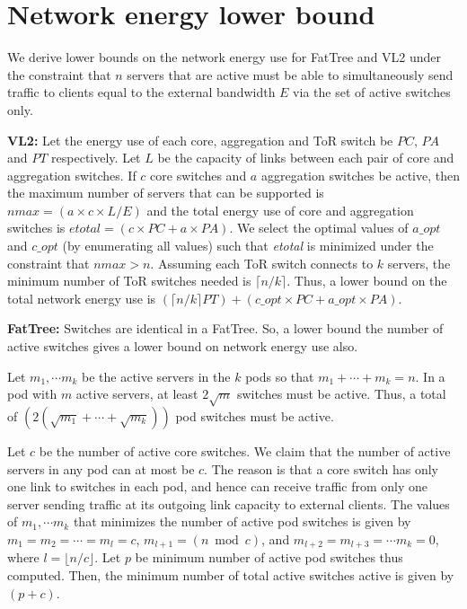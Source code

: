 


\section{Network energy lower bound}
\label{sec:netlb}
We derive lower bounds on the network energy use for FatTree \cite{fattree} and VL2 \cite{vl2} under the constraint that $n$  servers that are active must be able to simultaneously send traffic to clients equal to the external bandwidth $E$ via the set of active switches only.

\textbf{VL2:} Let the energy use of each core, aggregation and ToR switch be $PC$, $PA$ and $PT$ respectively.
Let $L$ be the capacity of links between each pair of core and aggregation switches. 
If  $c$ core switches and $a$ aggregation switches be active, then
the maximum number of servers that can be supported is $ \textit{nmax} = (a\times c\times L/E)$ and the total energy use of core and aggregation switches is $\textit{etotal} = (c \times PC + a \times PA)$. 
We select the optimal values of $\textit{a\_opt}$ and $\textit{c\_opt}$ (by enumerating all values) such that \textit{etotal} is minimized under the constraint that $\textit{nmax} > n$. 
Assuming each ToR switch connects to $k$ servers,  the minimum number of ToR switches needed is $\lceil n/k \rceil$. 
Thus, a lower bound on the total network energy use is $(\lceil n/k \rceil PT) + (\textit{c\_opt} \times PC + \textit{a\_opt} \times PA)$.


\textbf{FatTree:} Switches are identical in a FatTree. So, a lower bound the number of active switches gives a lower bound on network energy use also.




Let $m_1, \cdots m_k$ be the active servers in the $k$ pods so that $m_1 + \cdots + m_k = n$.  In a pod with $m$ active servers, at least $2 \sqrt{m}$ switches must be active. Thus, a total of $(2 (\sqrt{m_1} + \cdots + \sqrt{m_k} ))$ pod switches must be active. 

Let $c$ be the number of active core switches. We claim that the number of active servers in any pod can at most be $c$. The reason is that a core switch has only one link to switches in each pod, and hence can receive traffic from only one server sending traffic at its outgoing link capacity to external clients. The values of $m_1, \cdots m_k$ that minimizes the number of active pod switches is given by $m_1 = m_2 = \cdots = m_l = c$,  $m_{l+1} = (n \bmod c)$, and $m_{l+2} = m_{l+3} = \cdots  m_{k} = 0$, where $l = \lfloor n/c \rfloor$.  Let $p$ be minimum number of active pod switches thus computed. Then, the minimum number of total active switches active is given by $(p+c)$.



